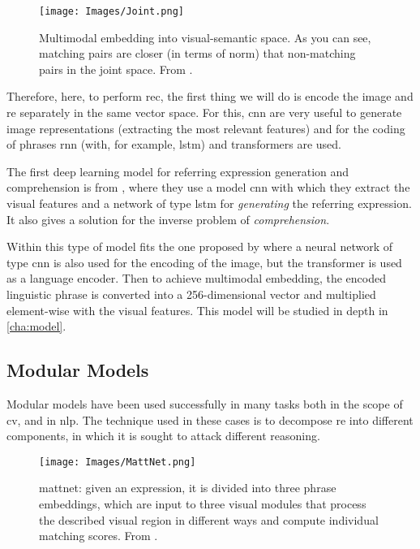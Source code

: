 \begin{figure}[ht]
  \centering
  \texttt{[image: Images/Joint.png]}
  \caption[Multimodal embedding technique]{Multimodal embedding into
    visual-semantic space. As you can see, matching pairs are closer (in terms
    of norm) that non-matching pairs in the joint space. From
    .}\label{fig:joint}
\end{figure}

Therefore, here, to perform \gls{rec}, the first thing we will do is encode the
image and \gls{re} separately in the same vector space. For this, \gls{cnn} are
very useful to generate image representations (extracting the most relevant
features) and for the coding of phrases \gls{rnn} (with, for example,
\gls{lstm}) and transformers are used.

The first deep learning model for referring expression generation and
comprehension is from , where they use a model \gls{cnn}
with which they extract the visual features and a network of type \gls{lstm}
for \emph{generating} the referring expression. It also gives a solution for the
inverse problem of \emph{comprehension}.

Within this type of model fits the one proposed by 
where a neural network of type \gls{cnn} is also used for the encoding of the
image, but the transformer is used as a language encoder. Then to achieve
multimodal embedding, the encoded linguistic phrase is converted into a
256-dimensional vector and multiplied element-wise with the visual
features. This model will be studied in depth in \vref{cha:model}.


\subsection{Modular Models}\label{sec:modular}
Modular models have been used successfully in many tasks both in the scope of
\gls{cv}, and in \gls{nlp}. The technique used in these cases is to decompose
\gls{re} into different components, in which it is sought to attack different
reasoning.

\begin{figure}[ht]
  \centering
  \texttt{[image: Images/MattNet.png]}
  \caption[\acl*{mattnet}]{\gls{mattnet}: given an expression, it is divided
    into three phrase embeddings, which are input to three visual modules that
    process the described visual region in different ways and compute
    individual matching scores. From
    .}\label{fig:mattnet}
\end{figure}

